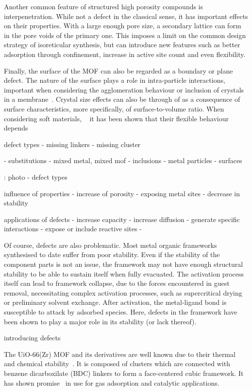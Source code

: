 Another common feature of structured high porosity compounds is 
interpenetration. While not a defect in the classical sense, 
it has important effects on their properties.
With a large enough pore size, a secondary lattice can form in the
pore voids of the primary one. This imposes a limit on the 
common design strategy of isoreticular synthesis, but can 
introduce new features such as better adsorption through 
confinement, increase in active site count and even flexibility.

Finally, the surface of the MOF can also be regarded as a 
boundary or plane defect. The nature of the surface plays a role
in intra-particle interactions, important when considering 
the agglomeration behaviour or inclusion of crystals in 
a membrane~\cite{seminoMicroscopicModelMetal2016}. 
Crystal size effects can also be through of as a consequence
of surface characteristics, more specifically, of surface-to-volume
ratio. When considering soft materials,
~\cite{krauseEffectCrystalliteSize2018, %
vanduyfhuysThermodynamicInsightStimuliresponsive2018} it has 
been shown that their flexible behaviour depends 

defect types
- missing linkers
- missing cluster

- substitutions - mixed metal, mixed mof
- inclusions - metal particles
- surfaces

: photo - defect types

influence of properties
- increase of porosity
- exposing metal sites
- decrease in stability 

applications of defects
- increase capacity
- increase diffusion
- generate specific interactions
- expose or include reactive sites
-

Of course, defects are also problematic. Most metal organic frameworks
synthesised to date suffer from poor stability. Even if the stability
of the component parts is not an issue, the framework may not have 
enough structural stability to be able to sustain itself when fully
evacuated. The activation process itself can lead to framework 
collapse, due to the forces encountered in guest removal, necessitating 
complex activation processes, such as supercritical drying or 
preliminary solvent exchange. After activation, the metal-ligand bond
is susceptible to attack by adsorbed species. Here, defects in the framework 
have been shown to play a major role in its stability (or lack thereof).
~\cite{burtchWaterStabilityAdsorption2014}

introducing defects

The UiO-66(Zr) MOF and its derivatives are well known due to their thermal and chemical 
stability~\cite{cavkaNewZirconiumInorganic2008}. It is composed of
 clusters which are connected with benzene dicarboxilate (BDC) linkers to form
a face-centered cubic framework. It has shown promise~\cite{wiersumEvaluationUiO66GasBased2011}
in use for gas adsorption and catalytic applications.